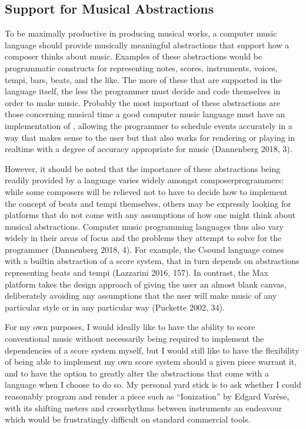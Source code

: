 \documentclass[letterpaper,10pt,english]{sphinxmanual}
\begin{document}
\subsection{Support for Musical Abstractions}
\label{\detokenize{background:support-for-musical-abstractions}}
\sphinxAtStartPar
To be maximally productive in producing musical works, a computer music language should provide
musically meaningful abstractions that support how a composer thinks about music.
Examples of these abstractions would be programmatic constructs for representing
notes, scores, instruments, voices, tempi, bars, beats, and the like.
The more of these that are supported in the language itself, the less the programmer
must decide and code themselves in order to make music.
Probably the most important of these abstractions are those concerning musical time
\sphinxhyphen{} a good computer music language must have an implementation of ,
allowing the programmer to schedule events accurately in a way that makes sense
to the user but that also works for rendering or playing in realtime with a degree of accuracy
appropriate for music (Dannenberg 2018, 3).

\sphinxAtStartPar
However, it should be noted that the importance of these abstractions being readily provided
by a language varies widely amongst composer\sphinxhyphen{}programmers:
while some composers will be relieved not to have to decide how to implement
the concept of beats and tempi themselves, others may be expressly looking for platforms
that do not come with any assumptions of how one might think about musical abstractions.
Computer music programming languages thus also vary widely in their areas
of focus and the problems they attempt to solve for the programmer (Dannenberg 2018, 4).
For example, the Csound language comes with a built\sphinxhyphen{}in abstraction of a score system,
that in turn depends on abstractions representing beats and tempi (Lazzarini 2016, 157).
In contrast, the Max platform takes the design approach of giving the user
an almost blank canvas, deliberately avoiding any assumptions that the user
will make music of any particular style or in any particular way (Puckette 2002, 34).

\sphinxAtStartPar
For my own purposes, I would ideally like to have the ability to score conventional music without
necessarily being required to implement  the dependencies of a score system myself,
but I would still like to have the flexibility of being able to implement my own score system
should a given piece warrant it, and to have the option to greatly alter the abstractions
that come with a language when I choose to do so.
My personal yard stick is to ask whether I could
reasonably program and render a piece such as “Ionization” by Edgard Varèse, with its shifting
meters and cross\sphinxhyphen{}rhythms between instruments \sphinxhyphen{} an endeavour which would be frustratingly
difficult on standard commercial tools.
\end{document}
